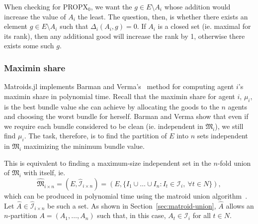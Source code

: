 When checking for PROPX$_0$, we want the $g\in E\setminus A_i$ whose addition would increase the value of $A_i$ the least. The question, then, is whether there exists an element $g\in E\setminus A_i$ such that $\Delta_i(A_i, g) = 0$. If $A_i$ is a closed set (ie. maximal for its rank), then any additional good will increase the rank by 1, otherwise there exists some such $g$.

\subsubsection*{Maximin share}
Matroids.jl implements Barman and Verma's~\cite[Appendix A]{barman2021existence} method for computing agent $i$'s maximin share in polynomial time. Recall that the maximin share for agent $i$,  $\mu_i$, is the best bundle value she can achieve by allocating the goods to the $n$ agents and choosing the worst bundle for herself. Barman and Verma show that even if we require each bundle considered to be clean (ie. independent in $\mathfrak{M}_i$), we still find $\mu_i$. The task, therefore, is to find the partition of $E$ into $n$ sets independent in $\mathfrak{M}_i$ maximizing the minimum bundle value.

This is equivalent to finding a maximum-size independent set in the $n$-fold union of $\mathfrak{M}_i$ with itself, ie.
$$\widehat{\mathfrak{M}}_{i \times n} = (E, \widehat{\mathcal{I}}_{i\times n}) = (E, \{ I_1\cup\dots\cup I_n : I_t \in \mathcal{I}_i,\ \forall t \in N \}),$$ 
which can be produced in polynomial time using the matroid union algorithm~\cite[Ch. 42]{schrijver-2003}. Let $\widehat{A}\in\widehat{\mathcal{I}}_{i\times n}$ be such a set. As shown in Section~\ref{sec:matroid-union}, $\widehat{A}$ allows an $n$-partition $A = (A_1,\dots,A_n)$ such that, in this case, $A_t\in\mathcal{I}_i$ for all $t\in N$.

